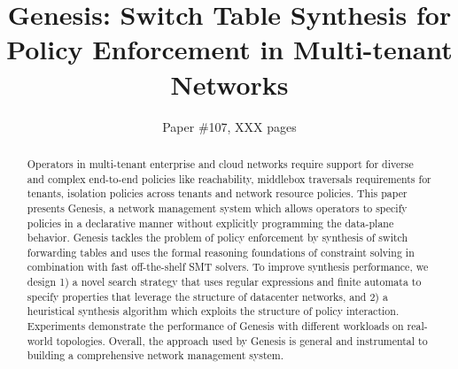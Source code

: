 \documentclass[letterpaper,twocolumn,10pt]{sig-alternate-10pt}
\title{Genesis: Switch Table Synthesis for Policy Enforcement in Multi-tenant Networks}
\author{Paper \#107, XXX pages}
\begin{document}
\maketitle

\begin{abstract}
Operators in multi-tenant enterprise and cloud networks require support for diverse and complex end-to-end policies like reachability, middlebox traversals requirements for tenants, isolation policies across tenants and network resource policies. 
This paper presents Genesis, a network management system which allows operators to specify policies in a declarative manner without explicitly programming the data-plane behavior. 
Genesis tackles the problem of policy enforcement by synthesis of switch forwarding tables and 
uses the formal reasoning foundations of constraint solving 
in combination with fast off-the-shelf SMT solvers. 
To improve synthesis performance, we design 
1) a novel search strategy 
that uses regular expressions and finite automata to specify properties that leverage the structure of datacenter networks,
and 
2) a heuristical synthesis algorithm which exploits the structure of policy interaction. 
Experiments demonstrate the performance of Genesis with different workloads on real-world topologies. Overall, the approach used by Genesis is general and instrumental to building a comprehensive network management system.

\end{abstract}












%



\begin{small}
	
\end{small}
\end{document}
